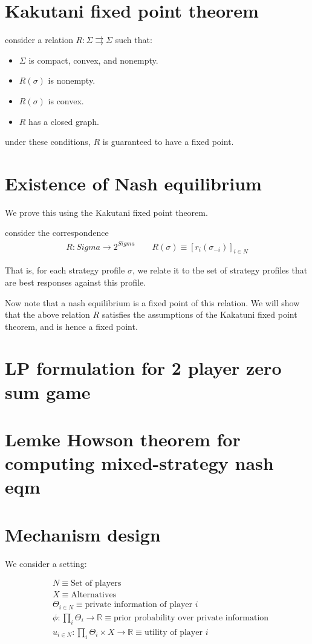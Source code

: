 \documentclass[11pt]{book}
\begin{document}
\section{Kakutani fixed point theorem}
consider a relation $R: \Sigma \rightrightarrows \Sigma$ such that:
\begin{itemize}
    \item $\Sigma$ is compact, convex, and nonempty.
    \item $R(\sigma)$ is nonempty.
    \item $R(\sigma)$ is convex.
    \item $R$ has a closed graph.
\end{itemize}

under these conditions, $R$ is guaranteed to have a fixed point.

\section{Existence of Nash equilibrium}
We prove this using the Kakutani fixed point theorem.

consider the correspondence
\begin{align*}
    R: Sigma \rightarrow 2^{Sigma} \qquad R(\sigma) \equiv [r_i(\sigma_{-i})]_{i \in N}
\end{align*}

That is, for each strategy profile $\sigma$, we relate it to the set
of strategy profiles that are best responses against this profile.

Now note that a nash equilibrium is a fixed point of this relation.
We will show that the above relation $R$ satisfies the assumptions
of the Kakatuni fixed point theorem, and is hence a fixed point.


\section{LP formulation for 2 player zero sum game}
\section{Lemke Howson theorem for computing mixed-strategy nash eqm}
\section{Mechanism design}
We consider a setting:

\begin{align*}
    &N \equiv \text{Set of players} \\
    &X  \equiv \text{Alternatives} \\
    &\Theta_{i \in N} \equiv \text{private information of player $i$} \\
    &\phi: \prod_i \Theta_i \rightarrow \mathbb R \equiv \text{prior probability over private information} \\
    &u_{i \in N}: \prod_i \Theta_i \times X \rightarrow \mathbb R \equiv \text{utility of player $i$} \\
\end{align*}
\end{document}
